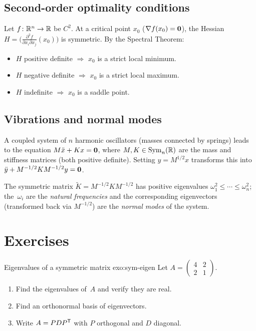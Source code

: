 \subsection{Second-order optimality conditions}%
\label{subsec:optimization}

Let $f\colon{\mathbb{R}}^n\to{\mathbb{R}}$ be $C^2$.  At a critical point $x_0$
($\nabla f(x_0)=\mathbf{0}$), the Hessian
$H = \bigl(\frac{\partial^2 f}{\partial x_i\partial x_j}(x_0)\bigr)$
is symmetric.  By the Spectral Theorem:
\begin{itemize}
  \item $H$ positive definite $\Rightarrow$ $x_0$ is a strict local minimum.
  \item $H$ negative definite $\Rightarrow$ $x_0$ is a strict local maximum.
  \item $H$ indefinite $\Rightarrow$ $x_0$ is a saddle point.
\end{itemize}

\subsection{Vibrations and normal modes}\label{subsec:vibrations}

A coupled system of $n$ harmonic oscillators (masses connected by
springs) leads to the equation $M\ddot{x} + Kx = \mathbf{0}$, where
$M,K\in\operatorname{Sym}_n({\mathbb{R}})$ are the mass and stiffness matrices (both positive
definite).  Setting $y = M^{1/2}x$ transforms this into
$\ddot{y} + M^{-1/2}KM^{-1/2}y = \mathbf{0}$.

The symmetric matrix $\tilde K = M^{-1/2}KM^{-1/2}$ has positive
eigenvalues $\omega_1^2\leq\cdots\leq\omega_n^2$; the~$\omega_i$ are
the \emph{natural frequencies} and the corresponding eigenvectors
(transformed back via $M^{-1/2}$) are the \emph{normal modes} of the
system.


\section{Exercises}\label{sec:spectral-exercises}

\begin{exercise}{Eigenvalues of a symmetric matrix \basic}{exo:sym-eigen}
Let $A = \begin{pmatrix} 4 & 2 \\ 2 & 1 \end{pmatrix}$.
\begin{enumerate}[label=\textup{(\alph*)}]
  \item Find the eigenvalues of~$A$ and verify they are real.
  \item Find an orthonormal basis of eigenvectors.
  \item Write $A = P D {P}^{\mathsf{T}}$ with $P$ orthogonal and $D$ diagonal.
\end{enumerate}
\end{exercise}

